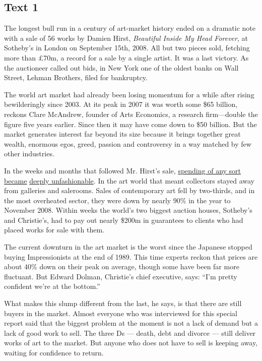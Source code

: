 \documentclass[UTF8,11pt]{ctexart}
\begin{document}
\subsection*{\textbf{Text 1}}


The longest bull run in a century of art-market history ended on a dramatic note with a sale of 56 works by Damien Hirst, \textit{Beautiful Inside My Head Forever}, at Sotheby’s in London on September 15th, 2008. All but two pieces sold, fetching more than £70m, a record for a sale by a single artist. It was a last victory. As the auctioneer called out bids, in New York one of the oldest banks on Wall Street, Lehman Brothers, filed for bankruptcy.


The world art market had already been losing momentum for a while after rising bewilderingly since 2003. At its peak in 2007 it was worth some \$65 billion, reckons Clare McAndrew, founder of Arts Economics, a research firm—double the figure five years earlier. Since then it may have come down to \$50 billion. But the market generates interest far beyond its size because it brings together great wealth, enormous egos, greed, passion and controversy in a way matched by few other industries.


In the weeks and months that followed Mr. Hirst’s sale, \uline{spending of any sort became} \uline{deeply unfashionable}. In the art world that meant collectors stayed away from galleries and salerooms. Sales of contemporary art fell by two-thirds, and in the most overheated sector, they were down by nearly 90\% in the year to November 2008. Within weeks the world’s two biggest auction houses, Sotheby’s and Christie’s, had to pay out nearly \$200m in guarantees to clients who had placed works for sale with them.


The current downturn in the art market is the worst since the Japanese stopped buying Impressionists at the end of 1989. This time experts reckon that prices are about 40\% down on their peak on average, though some have been far more fluctuant. But Edward Dolman, Christie’s chief executive, says: “I’m pretty confident we’re at the bottom.”


What makes this slump different from the last, he says, is that there are still buyers in the market. Almost everyone who was interviewed for this special report said that the biggest problem at the moment is not a lack of demand but a lack of good work to sell. The three Ds — death, debt and divorce — still deliver works of art to the market. But anyone who does not have to sell is keeping away, waiting for confidence to return.
\end{document}
